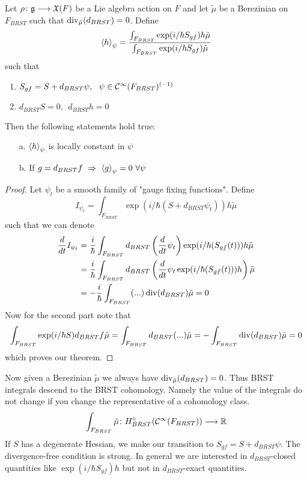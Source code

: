 \begin{theo}[BRST]
  Let $\rho \colon \mathfrak{g} \longrightarrow \mathfrak{X}(F)$ be a Lie algebra action on $F$ and let $\tilde{\mu}$ be a Berezinian on $F_{BRST}$ such that $\operatorname{div}_{\tilde{\mu}}(d_{BRST}) = 0$. Define
  $$ \left\langle h \right\rangle_\psi = \frac{\int_{F_{BRST}} \exp(i/\hbar S_{gf})h \tilde{\mu}}{\int_{F_{BRST}} \exp(i/\hbar S_{gf})\tilde{\mu}} $$
  such that
  \begin{enumerate}
    \item $S_{gf} = S + d_{BRST} \psi, \ \ \psi \in \mathcal{C}^{\infty}(F_{BRST})^{(-1)}$
    \item $d_{BRST} S = 0, \ \ d_{BRST} h = 0$
  \end{enumerate}
  Then the following statements hold true:
  \begin{itemize}
    \item[a.] $\left\langle h \right\rangle_\psi$ is locally constant in $\psi$
    \item[b.] If $g = d_{BRST} f \ \Rightarrow \ \left\langle g \right\rangle_\psi = 0 \ \forall \psi$
  \end{itemize}
\begin{proof}
  Let $\psi_t$ be a smooth family of "gauge fixing functions". Define
  $$I_{\psi_t} = \int_{F_{BRST}} \exp(i/\hbar (S+ d_{BRST} \psi_t)) h \tilde{\mu}$$
  such that we can denote
  \begin{align*}
    \frac{d }{d t} I_{\psi_t} &= \frac{i}{\hbar} \int_{F_{BRST}} d_{BRST}\left(\frac{d }{d t}\psi_t\right) \exp(i/\hbar (S_{gf}(t))) h \tilde{\mu} \\
    &= \frac{i}{\hbar} \int_{F_{BRST}} d_{BRST} \left( \frac{d }{d t}\psi_t \exp(i/\hbar (S_{gf}(t))) h \right) \tilde{\mu} \\
    &= - \frac{i}{\hbar} \int_{F_{BRST}} (...) \operatorname{div}(d_{BRST}) \tilde{\mu} = 0
  \end{align*}
  Now for the second part note that
  \begin{align*}
    \int_{F_{BRST}} \exp(i/\hbar S) d_{BRST} f \tilde{\mu} = \int_{F_{BRST}} d_{BRST} (...) \tilde{\mu} = - \int_{F_{BRST}} \operatorname{div}(d_{BRST}) \tilde{\mu} = 0
  \end{align*}
  which proves our theorem.
\end{proof}
\end{theo}

Now given a Berezinian $\tilde{\mu}$ we always have $\operatorname{div}_{\tilde{\mu}}(d_{BRST}) = 0$. Thus BRST integrals descend to the BRST cohomology. Namely the value of the integrals do not change if you change the representative of a cohomology class.
\begin{equation}
  \int_{F_{BRST}} \tilde{\mu} \colon H^\circ_{BRST} (\mathcal{C}^{\infty}(F_{BRST})) \longrightarrow \mathbb{R}
\end{equation}
If $S$ has a degenerate Hessian, we make our transition to $S_{gf} = S + d_{BRST} \psi$. The divergence-free condition is strong. In general we are interested in $d_{BRST}$-closed quantities like $\exp(i/ \hbar S_{gf}) h$ but not in $d_{BRST}$-exact quantities.\\

